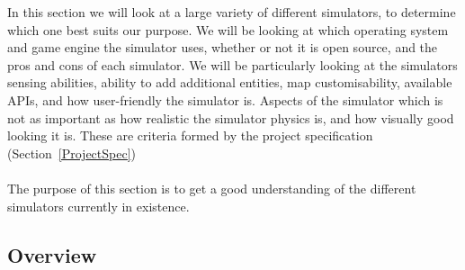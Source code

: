 In this section we will look at a large variety of different simulators, to determine which one best suits our purpose. We will be looking at which operating system and game engine the simulator uses, whether or not it is open source, and the pros and cons of each simulator. We will be particularly looking at the simulators sensing abilities, ability to add additional entities, map customisability, available APIs, and how user-friendly the simulator is. Aspects of the simulator which is not as important as how realistic the simulator physics is, and how visually good looking it is. These are criteria formed by the project specification (Section~\ref{ProjectSpec})
\\~\\
The purpose of this section is to get a good understanding of the different simulators currently in existence.

\subsection{Overview}




